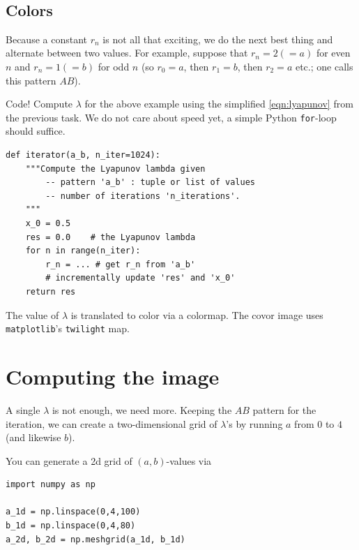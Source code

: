 \documentclass[english,landscape]{article}
\begin{document}
\begin{minipage}[c]{0.1\pagewidth}
\,
\end{minipage}%
\begin{minipage}[c]{0.4\pagewidth}
\subsection{Colors}
Because a constant $r_n$ is not all that exciting, we do the next best thing and alternate between two values.
For example, suppose that $r_n=2(=a)$ for even $n$ and $r_n=1(=b)$ for odd $n$ (so $r_0=a$, then $r_1=b$, then $r_2=a$ etc.; one calls this pattern $AB$).
\begin{taskbox}{Code!}
Compute $\lambda$ for the above example using the simplified \autoref{eqn:lyapunov} from the previous task.
We do not care about speed yet, a simple Python \texttt{for}-loop should suffice.
\begin{verbatim}
def iterator(a_b, n_iter=1024):
    """Compute the Lyapunov lambda given
        -- pattern 'a_b' : tuple or list of values
        -- number of iterations 'n_iterations'.
    """
    x_0 = 0.5
    res = 0.0    # the Lyapunov lambda
    for n in range(n_iter):
        r_n = ... # get r_n from 'a_b'
        # incrementally update 'res' and 'x_0'
    return res
\end{verbatim}
\end{taskbox}
The value of $\lambda$ is translated to color via a colormap.
The covor image uses \texttt{matplotlib}'s \texttt{twilight} map.
\section{Computing the image}
A single $\lambda$ is not enough, we need more.
Keeping the $AB$ pattern for the iteration, we can create a two-dimensional grid of $\lambda$'s by running $a$ from $0$ to $4$ (and likewise $b$).

You can generate a 2d grid of $(a,b)$-values via
\begin{verbatim}
import numpy as np

a_1d = np.linspace(0,4,100)
b_1d = np.linspace(0,4,80)
a_2d, b_2d = np.meshgrid(a_1d, b_1d)
\end{verbatim}
\end{minipage}
\newpage
\end{document}
